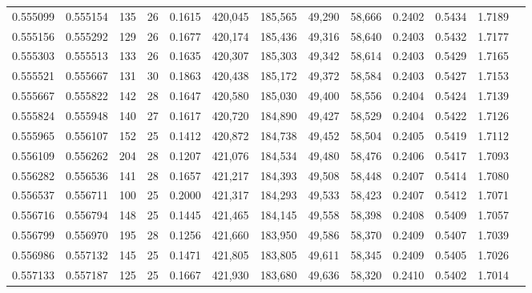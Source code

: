 \begin{tabular}{rrrrrrrrrrrrr}
0.555099 & 0.555154 &   135 &  26 &                                     0.1615 & 420,045 & 185,565 &  49,290 &  58,666 & 0.2402 & 0.5434 & 1.7189 \\
0.555156 & 0.555292 &   129 &  26 &                                     0.1677 & 420,174 & 185,436 &  49,316 &  58,640 & 0.2403 & 0.5432 & 1.7177 \\
0.555303 & 0.555513 &   133 &  26 &                                     0.1635 & 420,307 & 185,303 &  49,342 &  58,614 & 0.2403 & 0.5429 & 1.7165 \\
0.555521 & 0.555667 &   131 &  30 &                                     0.1863 & 420,438 & 185,172 &  49,372 &  58,584 & 0.2403 & 0.5427 & 1.7153 \\
0.555667 & 0.555822 &   142 &  28 &                                     0.1647 & 420,580 & 185,030 &  49,400 &  58,556 & 0.2404 & 0.5424 & 1.7139 \\
0.555824 & 0.555948 &   140 &  27 &                                     0.1617 & 420,720 & 184,890 &  49,427 &  58,529 & 0.2404 & 0.5422 & 1.7126 \\
0.555965 & 0.556107 &   152 &  25 &                                     0.1412 & 420,872 & 184,738 &  49,452 &  58,504 & 0.2405 & 0.5419 & 1.7112 \\
0.556109 & 0.556262 &   204 &  28 &                                     0.1207 & 421,076 & 184,534 &  49,480 &  58,476 & 0.2406 & 0.5417 & 1.7093 \\
0.556282 & 0.556536 &   141 &  28 &                                     0.1657 & 421,217 & 184,393 &  49,508 &  58,448 & 0.2407 & 0.5414 & 1.7080 \\
0.556537 & 0.556711 &   100 &  25 &                                     0.2000 & 421,317 & 184,293 &  49,533 &  58,423 & 0.2407 & 0.5412 & 1.7071 \\
0.556716 & 0.556794 &   148 &  25 &                                     0.1445 & 421,465 & 184,145 &  49,558 &  58,398 & 0.2408 & 0.5409 & 1.7057 \\
0.556799 & 0.556970 &   195 &  28 &                                     0.1256 & 421,660 & 183,950 &  49,586 &  58,370 & 0.2409 & 0.5407 & 1.7039 \\
0.556986 & 0.557132 &   145 &  25 &                                     0.1471 & 421,805 & 183,805 &  49,611 &  58,345 & 0.2409 & 0.5405 & 1.7026 \\
0.557133 & 0.557187 &   125 &  25 &                                     0.1667 & 421,930 & 183,680 &  49,636 &  58,320 & 0.2410 & 0.5402 & 1.7014 \\

\end{tabular}
